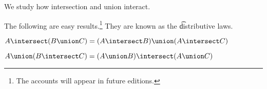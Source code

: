 

We study how intersection and union interact.


The following are easy results.\footnote{The accounts will appear in future editions.}
They are known as the \t{distributive laws}.

\begin{proposition}
  $A \intersect (B \union C) = (A \intersect B) \union (A \intersect C)$
\end{proposition}

\begin{proposition}
  $A \union (B \intersect C) = (A \union B) \intersect (A \union C)$
\end{proposition}

\blankpage
